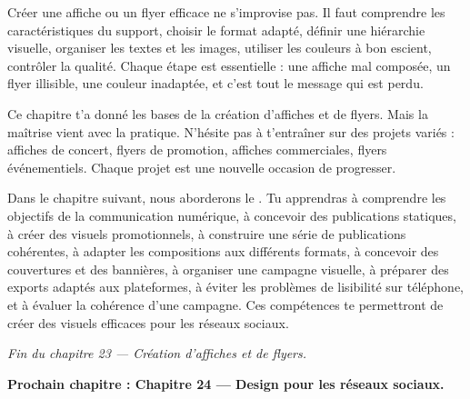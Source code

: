 Créer une affiche ou un flyer efficace ne s'improvise pas. Il faut comprendre les caractéristiques du support, choisir le format adapté, définir une hiérarchie visuelle, organiser les textes et les images, utiliser les couleurs à bon escient, contrôler la qualité. Chaque étape est essentielle : une affiche mal composée, un flyer illisible, une couleur inadaptée, et c'est tout le message qui est perdu.

Ce chapitre t'a donné les bases de la création d'affiches et de flyers. Mais la maîtrise vient avec la pratique. N'hésite pas à t'entraîner sur des projets variés : affiches de concert, flyers de promotion, affiches commerciales, flyers événementiels. Chaque projet est une nouvelle occasion de progresser.

Dans le chapitre suivant, nous aborderons le . Tu apprendras à comprendre les objectifs de la communication numérique, à concevoir des publications statiques, à créer des visuels promotionnels, à construire une série de publications cohérentes, à adapter les compositions aux différents formats, à concevoir des couvertures et des bannières, à organiser une campagne visuelle, à préparer des exports adaptés aux plateformes, à éviter les problèmes de lisibilité sur téléphone, et à évaluer la cohérence d'une campagne. Ces compétences te permettront de créer des visuels efficaces pour les réseaux sociaux.

\vspace{2em}

\begin{center}
\textit{Fin du chapitre 23 --- Création d'affiches et de flyers.}

\vspace{1em}

\textbf{Prochain chapitre : Chapitre 24 --- Design pour les réseaux sociaux.}
\end{center}